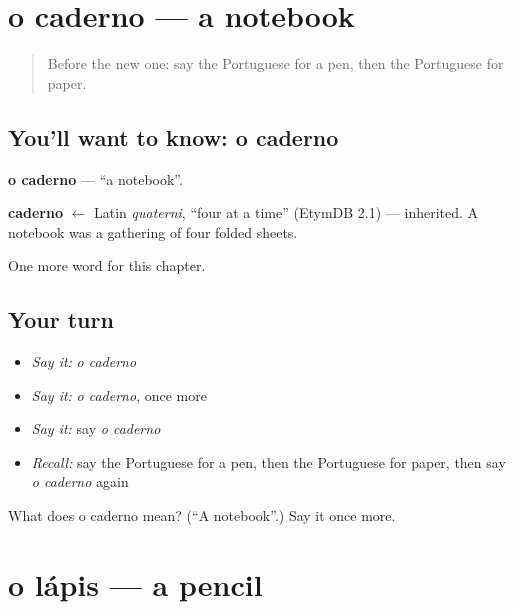 \section[o caderno]{o caderno — a notebook}

\label{lesson:PT-C52-caderno}



\begin{quote}
Before the new one: say the Portuguese for a pen, then the Portuguese for paper.
\end{quote}

\subsection*{You'll want to know: o caderno}
\textbf{o caderno} — \textquotedblleft{}a notebook\textquotedblright{}.

\begin{cousinweb}
\textbf{caderno} $\leftarrow$ Latin \emph{quaterni}, \textquotedblleft{}four at a time\textquotedblright{} (EtymDB 2.1) — inherited. A notebook was a gathering of four folded sheets.
\end{cousinweb}

\begin{grammarlens}[title={What you've built}]
One more word for this chapter.
\end{grammarlens}

\subsection*{Your turn}
\begin{itemize}
\raggedright
  \item \emph{Say it:} \emph{o caderno}
  \item \emph{Say it:} \emph{o caderno}, once more
  \item \emph{Say it:} say \emph{o caderno}
  \item \emph{Recall:} say the Portuguese for a pen, then the Portuguese for paper, then say \emph{o caderno} again
\end{itemize}

\begin{tcolorbox}[breakable,colback=teal!4,colframe=teal!35!black,title={Before you move on}]
What does o caderno mean? (\textquotedblleft{}A notebook\textquotedblright{}.) Say it once more.
\end{tcolorbox}
\section[o lápis]{o lápis — a pencil}

